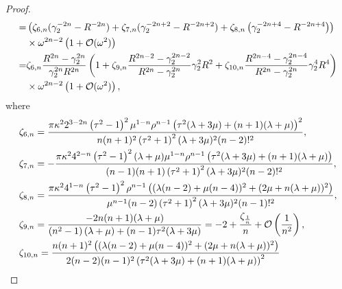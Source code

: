 \documentclass[10pt,a4paper]{amsart}
\begin{document}
\begin{proof}
\begin{align}
		=&\left(\zeta _{6,n} (\gamma_2 ^{-2n}-R^{-2n})+\zeta _{7,n} (\gamma_2 ^{-2n+2}-R^{-2n+2})+\zeta _{8,n} \left( \gamma_2 ^{-2n+4}-R^{-2n+4}\right)\right)\notag\\
		& \times  \omega ^{2n-2}\left(1+ \mathcal{O}(\omega^{2})\right)\notag\\
		=&\zeta _{6,n}\frac{R^{2n}-\gamma_2 ^{2n}}{\gamma_2 ^{2n}R^{2n}}\left(1+\zeta _{9,n} \frac{R^{2n-2}-\gamma_{2}^{2n-2}}{R^{2n}-\gamma_2 ^{2n}}\gamma_2 ^{2}R^{2}+\zeta _{10,n} \frac{R^{2n-4}-\gamma_{2}^{2n-4}}{R^{2n}-\gamma_2 ^{2n}}\gamma_2 ^{4}R^{4}\right)\notag\\
		&\times \omega ^{2n-2}\left(1+ \mathcal{O}(\omega^{2})\right),\notag
	\end{align}
	where
	\begin{align}
		&\zeta _{6,n}=\frac{\pi\kappa^2 2^{3-2 n} \left(\tau ^2-1\right)^2 \mu ^{1-n} \rho ^{n-1} \left(\tau ^2 (\lambda +3 \mu )+(n+1) (\lambda +\mu )\right)^2}{n(n+1)^2 \left(\tau ^2+1\right)^2 (\lambda +3 \mu )^2  (n-2)!^2},\notag\\
		&\zeta_{7,n}=-\frac{\pi\kappa^2 4^{2-n} \left(\tau ^2-1\right)^2 (\lambda +\mu ) \mu ^{1-n} \rho ^{n-1} \left(\tau ^2 (\lambda +3 \mu )+(n+1) (\lambda +\mu )\right)}{(n-1)(n+1) \left(\tau ^2+1\right)^2 (\lambda +3 \mu )^2  (n-2)!^2},\notag\\
		&\zeta_{8,n}=\frac{\pi\kappa^2 4^{1-n} \left(\tau ^2-1\right)^2 \rho ^{n-1} \left((\lambda  (n-2)+\mu  (n-4))^2+(2 \mu +n (\lambda +\mu ))^2\right)}{\mu ^{n-1} (n-2)\left(\tau ^2+1\right)^2 (\lambda +3 \mu )^2 (n-1)!^2},\notag\\
		&\zeta _{9,n}=\frac{-2 n (n+1) (\lambda +\mu )}{\left(n^2-1\right) (\lambda +\mu )+(n-1) \tau ^2 (\lambda +3 \mu )}=-2+\frac{\zeta_{\frac{1}{n}}}{n}+\mathcal{O}\left(\frac{1}{n^2}\right),\notag\\
		&\zeta _{10,n}=\frac{n (n+1)^2 \left((\lambda  (n-2)+\mu  (n-4))^2+(2 \mu +n (\lambda +\mu ))^2\right)}{2 (n-2) (n-1)^2 \left(\tau ^2 (\lambda +3 \mu )+(n+1) (\lambda +\mu )\right)^2}\notag\\

\end{align}
\end{proof}
\end{document}
